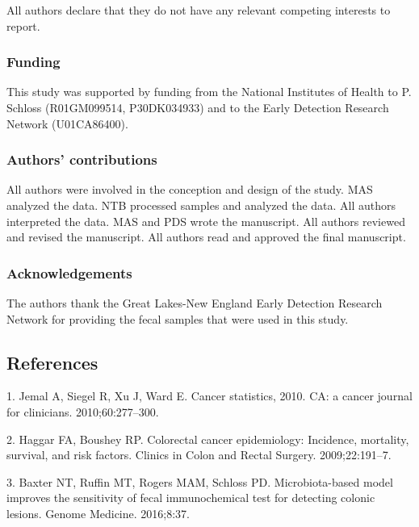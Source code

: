 \documentclass[12pt,]{article}
\begin{document}
All authors declare that they do not have any relevant competing
interests to report.

\subsubsection{Funding}\label{funding}

This study was supported by funding from the National Institutes of
Health to P. Schloss (R01GM099514, P30DK034933) and to the Early
Detection Research Network (U01CA86400).

\subsubsection{Authors' contributions}\label{authors-contributions}

All authors were involved in the conception and design of the study. MAS
analyzed the data. NTB processed samples and analyzed the data. All
authors interpreted the data. MAS and PDS wrote the manuscript. All
authors reviewed and revised the manuscript. All authors read and
approved the final manuscript.

\subsubsection{Acknowledgements}\label{acknowledgements}

The authors thank the Great Lakes-New England Early Detection Research
Network for providing the fecal samples that were used in this study.

\newpage

\subsection*{References}\label{references}

\hypertarget{refs}{}
\hypertarget{ref-jemal_cancer_2010}{}
1. Jemal A, Siegel R, Xu J, Ward E. Cancer statistics, 2010. CA: a
cancer journal for clinicians. 2010;60:277--300.

\hypertarget{ref-haggar_colorectal_2009}{}
2. Haggar FA, Boushey RP. Colorectal cancer epidemiology: Incidence,
mortality, survival, and risk factors. Clinics in Colon and Rectal
Surgery. 2009;22:191--7.

\hypertarget{ref-baxter_microbiota-based_2016}{}
3. Baxter NT, Ruffin MT, Rogers MAM, Schloss PD. Microbiota-based model
improves the sensitivity of fecal immunochemical test for detecting
colonic lesions. Genome Medicine. 2016;8:37.
\end{document}
